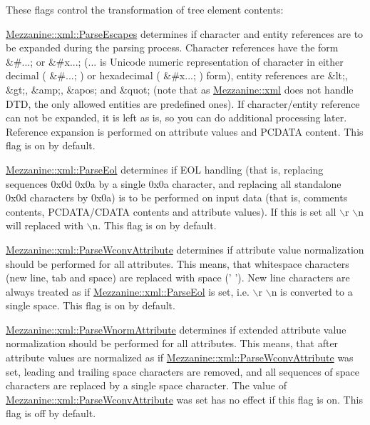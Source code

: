 These flags control the transformation of tree element contents:
\begin{DoxyItemize}
\item \hyperlink{namespaceMezzanine_1_1xml_a5f0acdde0e19954a8e333b2899708e62}{Mezzanine::xml::ParseEscapes} determines if character and entity references are to be expanded during the parsing process. Character references have the form \&\#...; or \&\#x...; (... is Unicode numeric representation of character in either decimal ( \&\#...; ) or hexadecimal ( \&\#x...; ) form), entity references are \&lt;, \&gt;, \&amp;, \&apos; and \&quot; (note that as \hyperlink{namespaceMezzanine_1_1xml}{Mezzanine::xml} does not handle DTD, the only allowed entities are predefined ones). If character/entity reference can not be expanded, it is left as is, so you can do additional processing later. Reference expansion is performed on attribute values and PCDATA content. This flag is on by default.
\item \hyperlink{namespaceMezzanine_1_1xml_a4b763117fdd2d6ff31b21a710f6b4cdd}{Mezzanine::xml::ParseEol} determines if EOL handling (that is, replacing sequences 0x0d 0x0a by a single 0x0a character, and replacing all standalone 0x0d characters by 0x0a) is to be performed on input data (that is, comments contents, PCDATA/CDATA contents and attribute values). If this is set all $\backslash$r $\backslash$n will replaced with $\backslash$n. This flag is on by default.
\item \hyperlink{namespaceMezzanine_1_1xml_a9e9a386f6a2e7dac28df4b581d8f49b3}{Mezzanine::xml::ParseWconvAttribute} determines if attribute value normalization should be performed for all attributes. This means, that whitespace characters (new line, tab and space) are replaced with space (' '). New line characters are always treated as if \hyperlink{namespaceMezzanine_1_1xml_a4b763117fdd2d6ff31b21a710f6b4cdd}{Mezzanine::xml::ParseEol} is set, i.e. $\backslash$r $\backslash$n is converted to a single space. This flag is on by default.
\item \hyperlink{namespaceMezzanine_1_1xml_ad805b2d64aacf612603631761f3317d6}{Mezzanine::xml::ParseWnormAttribute} determines if extended attribute value normalization should be performed for all attributes. This means, that after attribute values are normalized as if \hyperlink{namespaceMezzanine_1_1xml_a9e9a386f6a2e7dac28df4b581d8f49b3}{Mezzanine::xml::ParseWconvAttribute} was set, leading and trailing space characters are removed, and all sequences of space characters are replaced by a single space character. The value of \hyperlink{namespaceMezzanine_1_1xml_a9e9a386f6a2e7dac28df4b581d8f49b3}{Mezzanine::xml::ParseWconvAttribute} was set has no effect if this flag is on. This flag is off by default.
\end{DoxyItemize}

